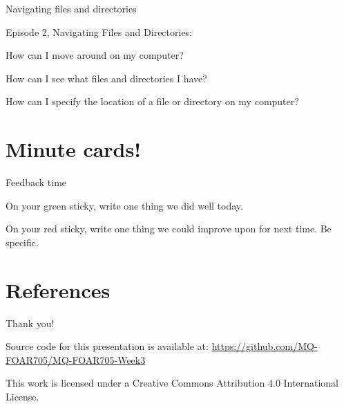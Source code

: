 \documentclass[aspectratio=1610, 11pt]{beamer} %
\begin{document}
\begin{frame}{Navigating files and directories}

Episode 2, Navigating Files and Directories:

How can I move around on my computer? 

How can I see what files and directories I have? 

How can I specify the location of a file or directory on my computer?

\end{frame}

\section{Minute cards!}
\begin{frame}{Feedback time}

On your green sticky, write one thing we did well today.

On your red sticky, write one thing we could improve upon for next time. Be specific. 

\end{frame}

\section{References}

\begin{multicols}{2}[]


\end{multicols}


  
%   
%   


\begin{frame}{Thank you!}


Source code for this presentation is available at: \url{https://github.com/MQ-FOAR705/MQ-FOAR705-Week3}

This work is licensed under a Creative Commons Attribution 4.0 International License.

\end{frame}
\end{document}
